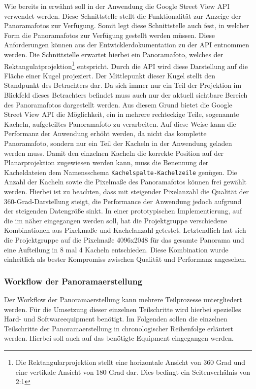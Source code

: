 Wie bereits in  erwähnt soll in der Anwendung die Google
Street View API verwendet werden. Diese Schnittstelle stellt die Funktionalität
zur Anzeige der Panoramafotos zur Verfügung. Somit legt diese Schnittstelle auch
fest, in welcher Form die Panoramafotos zur Verfügung gestellt werden müssen.
Diese Anforderungen können aus der Entwicklerdokumentation zu der API entnommen
werden. Die Schnittstelle erwartet hierbei ein Panoramafoto, welches der
Rektangulatprojektion\footnote{Die Rektangularprojektion stellt eine
horizontale Ansicht von 360 Grad und eine vertikale Ansicht von 180 Grad dar.
Dies bedingt ein Seitenverhälnis von 2:1} entspricht. Durch die API wird diese
Darstellung auf die Fläche einer Kugel projeziert. Der Mittlepunkt dieser Kugel
stellt den Standpunkt des Betrachters dar. Da sich immer nur ein Teil der
Projektion im Blickfeld dieses Betrachters befindet muss auch nur der aktuell
sichtbare Bereich des Panoramafotos dargestellt werden. Aus diesem Grund bietet
die Google Street View API die Möglichkeit, ein in mehrere rechteckige Teile,
sogenannte Kacheln, aufgeteiltes Panoramafoto zu verarbeiten. Auf diese Weise
kann die Performanz der Anwendung erhöht werden, da nicht das komplette
Panoramafoto, sondern nur ein Teil der Kacheln in der Anwendung geladen werden
muss. Damit den einzelnen Kacheln die korrekte Position auf der Planarprojektion
zugewiesen werden kann, muss die Benennung der Kacheldateien dem Namensschema
\texttt{Kachelspalte-Kachelzeile} genügen. Die Anzahl der Kacheln sowie die
Pixelmaße des Panoramafotos können frei gewählt werden. Hierbei ist zu beachten,
dass mit steigender Pixelanzahl die Qualität der 360-Grad-Darstellung steigt,
die Performance der Anwendung jedoch aufgrund der steigenden Datengröße sinkt.
In einer prototypischen Implementierung, auf die im 
näher eingegangen werden soll, hat die Projektgruppe verschiedene Kombinationen
aus Pixekmaße und Kachelanzahl getestet. Letztendlich hat sich die Projektgruppe
auf die Pixelmaße 4096x2048 für das gesamte Panorama und eine Aufteilung in 8
mal 4 Kacheln entschieden. Diese Kombination wurde einheitlich als bester
Kompromiss zwischen Qualität und Performanz angesehen.

\subsubsection{Workflow der Panoramaerstellung}
\label{sec:Workflow}

Der Workflow der Panoramaerstellung kann mehrere Teilprozesse untergliedert
werden. Für die Umsetzung dieser einzelnen Teilschritte wird hierbei spezielles
Hard- und Softwareequipment benötigt. Im Folgenden sollen die einzelnen
Teilschritte der Panoramaerstellung in chronologischer Reihenfolge erläutert
werden. Hierbei soll auch auf das benötigte Equipment eingegangen werden.

